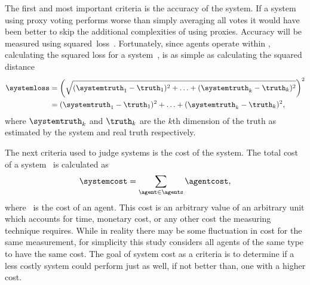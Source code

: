 The first and most important criteria is the accuracy of the system.
If a system using proxy voting performs worse than simply averaging all votes
it would have been better to skip the additional complexities of using
proxies.
Accuracy will be measured using squared~loss~\loss.
Fortunately, since agents operate within \systemspace, calculating the
squared loss for a system~\systemloss, is as simple as calculating the
squared distance
\begin{align}
    \systemloss &= {
        \left(\sqrt{
            (\systemtruth_1 - \truth_1)^2 +
            \mathellipsis +
            (\systemtruth_k - \truth_k)^2
        }\right)
    }^2 \nonumber \\
    &= (\systemtruth_1 - \truth_1)^2 +
    \mathellipsis +
    (\systemtruth_k - \truth_k)^2
    \text{,}\label{eq:loss}
\end{align}
where $\systemtruth_k$ and $\truth_k$ are the $k$th
dimension of the truth as estimated by the system and real truth respectively.

The next criteria used to judge systems is the cost of the system.
The total cost of a system \systemcost\ is calculated as
\begin{equation}
    \systemcost =
    \sum_{\agent \in \agents}{
        \agentcost
    }
    \text{,}\label{eq:cost}
\end{equation}
where \agentcost\ is the cost of an agent.
This cost is an arbitrary value of an arbitrary unit which accounts for time,
monetary cost, or any other cost the measuring technique requires.
While in reality there may be some fluctuation in cost for the same
measurement, for simplicity this study considers all agents of the same type
to have the same cost.
The goal of system cost as a criteria is to determine if a less costly system
could perform just as well, if not better than, one with a higher cost.



